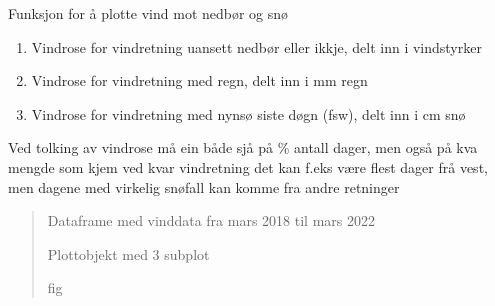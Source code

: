 \documentclass[letterpaper,10pt,norsk]{sphinxmanual}
\begin{document}
\begin{fulllineitems}
\label{\detokenize{index:klimadata.plot.vind}}
\pysigstartsignatures
{}
\pysigstopsignatures
\sphinxAtStartPar
Funksjon for å plotte vind mot nedbør og snø
\begin{description}
\begin{enumerate}
%
\item {} 
\sphinxAtStartPar
Vindrose for vindretning uansett nedbør eller ikkje, delt inn i vindstyrker

\item {} 
\sphinxAtStartPar
Vindrose for vindretning med regn, delt inn i mm regn

\item {} 
\sphinxAtStartPar
Vindrose for vindretning med nynsø siste døgn (fsw), delt inn i cm snø

\end{enumerate}

\end{description}

\sphinxAtStartPar
Ved tolking av vindrose må ein både sjå på \% antall dager, men også på kva mengde som kjem ved kvar vindretning
det kan f.eks være flest dager frå vest, men dagene med virkelig snøfall kan komme fra andre retninger
\begin{quote}\begin{description}
\sphinxAtStartPar
{} \textendash{} Dataframe med vinddata fra mars 2018 til mars 2022

\sphinxAtStartPar
Plott\sphinxhyphen{}objekt med 3 subplot

\sphinxAtStartPar
fig

\end{description}\end{quote}

\end{fulllineitems}



\renewcommand{\indexname}{Python Modulindex}
\begin{sphinxtheindex}
\let\bigletter\sphinxstyleindexlettergroup
\bigletter{k}
\item\relax{}
\item\relax{}
\end{sphinxtheindex}

\renewcommand{\indexname}{Index}
\printindex
\end{document}
